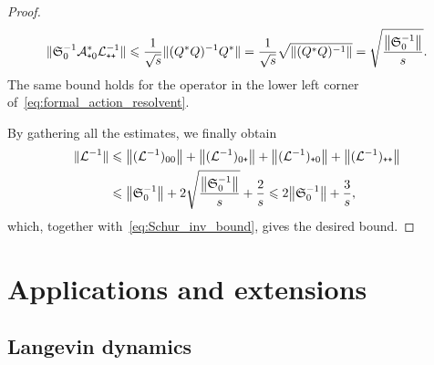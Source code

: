 \documentclass{article}
\newcommand{\cL}{\mathcal{L}}
\newcommand{\cLa}{\mathcal{A}}
\newcommand{\Schur}{\mathfrak{S}_0}
\newcommand{\subplus}{\textnormal{\texttt{+}}}
\renewcommand{\leq}{\leqslant}
\renewcommand{\le}{\leqslant}
\begin{document}
\begin{proof}
\begin{align*}
  \|\Schur^{-1} \cLa_{\subplus0}^{*} \cL_{\subplus\subplus}^{-1}\| \le \frac 1 {\sqrt s} \|(Q^{*}Q)^{-1} Q^*\| = \frac 1 {\sqrt s} \sqrt{\|(Q^{*}Q)^{-1}\|} = \sqrt{\frac { \norm{\Schur^{-1}}} { s}}.
\end{align*}
The same bound holds for the operator in the lower left corner of~\eqref{eq:formal_action_resolvent}.

By gathering all the estimates, we finally obtain
\begin{align*}
  \|\cL^{-1}\| &\le \left\|(\cL^{-1})_{00}\right\| + \left\|(\cL^{-1})_{0\subplus}\right\| + \left\|(\cL^{-1})_{\subplus0}\right\| + \left\|(\cL^{-1})_{\subplus\subplus}\right\|\\
  &\le  \norm{\Schur^{-1}} + 2 \sqrt{\frac { \norm{\Schur^{-1}}} { s}} + \frac 2 s \le 2\norm{\Schur^{-1}} + \frac 3 s,
\end{align*}
which, together with~\eqref{eq:Schur_inv_bound}, gives the desired bound.
\end{proof}

\section{Applications and extensions}
\label{sec:applications}

\subsection{Langevin dynamics}
\label{sec:application_Langevin}
\end{document}
